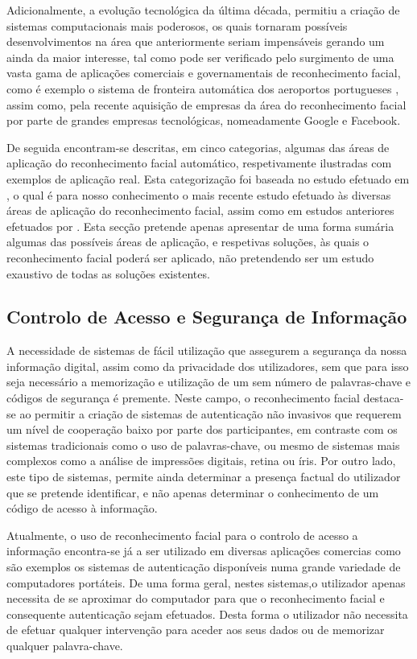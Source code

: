 Adicionalmente, a evolução tecnológica da última década, permitiu a criação de sistemas computacionais mais poderosos, os quais tornaram possíveis desenvolvimentos na área que anteriormente seriam impensáveis gerando um ainda da maior interesse, tal como pode ser verificado pelo surgimento de uma vasta gama de aplicações comerciais e governamentais de reconhecimento facial, como é exemplo o sistema de fronteira automática dos aeroportos portugueses \citep{MinisteriodaAdministracaoInternaa}, assim como, pela recente aquisição de empresas da área do reconhecimento facial por parte de grandes empresas tecnológicas, nomeadamente Google e Facebook.

De seguida encontram-se descritas, em cinco categorias, algumas das áreas de aplicação do reconhecimento facial automático, respetivamente ilustradas com exemplos de aplicação real. Esta categorização foi baseada no estudo efetuado em \cite{Li2011}, o qual é para nosso conhecimento o mais recente estudo efetuado às diversas áreas de aplicação do reconhecimento facial, assim como em estudos anteriores efetuados por \cite{Zhao2003}. Esta secção pretende apenas apresentar de uma forma sumária algumas das possíveis áreas de aplicação, e respetivas soluções, às quais o reconhecimento facial poderá ser aplicado, não pretendendo ser um estudo exaustivo de todas as soluções existentes.

\subsection{Controlo de Acesso e Segurança de Informação} \label{sec:controloAcesso}
A necessidade de sistemas de fácil utilização que assegurem a segurança da nossa informação digital, assim como da privacidade dos utilizadores, sem que para isso seja necessário a memorização e utilização de um sem número de palavras-chave e códigos de segurança é premente. Neste campo, o reconhecimento facial destaca-se ao permitir a criação de sistemas de autenticação não invasivos que requerem um nível de cooperação baixo por parte dos participantes, em contraste com os sistemas tradicionais como o uso de palavras-chave, ou mesmo de sistemas mais complexos como a análise de impressões digitais, retina ou íris. Por outro lado, este tipo de sistemas, permite ainda determinar a presença factual do utilizador que se pretende identificar, e não apenas determinar o conhecimento de um código de acesso à informação.

Atualmente, o uso de reconhecimento facial para o controlo de acesso a informação encontra-se já a ser utilizado em diversas aplicações comercias como são exemplos os sistemas de autenticação disponíveis numa grande variedade de computadores portáteis. De uma forma geral, nestes sistemas,o utilizador apenas necessita de se aproximar do computador para que o reconhecimento facial e consequente autenticação sejam efetuados. Desta forma o utilizador não necessita de efetuar qualquer intervenção para aceder aos seus dados ou de memorizar qualquer palavra-chave.

